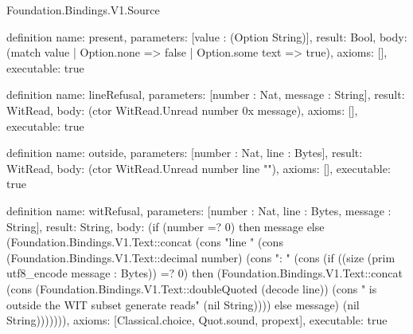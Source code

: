 \begin{lexlean}{Foundation.Bindings.V1.Source}
\begin{semanticmodule}
definition{
  name: present,
  parameters: [value : (Option String)],
  result: Bool,
  body: (match value | Option.none => false | Option.some text => true),
  axioms: [],
  executable: true
}

definition{
  name: lineRefusal,
  parameters: [number : Nat, message : String],
  result: WitRead,
  body: (ctor WitRead.Unread number 0x message),
  axioms: [],
  executable: true
}

definition{
  name: outside,
  parameters: [number : Nat, line : Bytes],
  result: WitRead,
  body: (ctor WitRead.Unread number line ""),
  axioms: [],
  executable: true
}

definition{
  name: witRefusal,
  parameters: [number : Nat, line : Bytes, message : String],
  result: String,
  body: (if (number =? 0) then message else (Foundation.Bindings.V1.Text::concat (cons "line " (cons (Foundation.Bindings.V1.Text::decimal number) (cons ": " (cons (if ((size (prim utf8_encode message : Bytes)) =? 0) then (Foundation.Bindings.V1.Text::concat (cons (Foundation.Bindings.V1.Text::doubleQuoted (decode line)) (cons " is outside the WIT subset generate reads" (nil String)))) else message) (nil String))))))),
  axioms: [Classical.choice, Quot.sound, propext],
  executable: true
}


\end{semanticmodule}
\end{lexlean}
